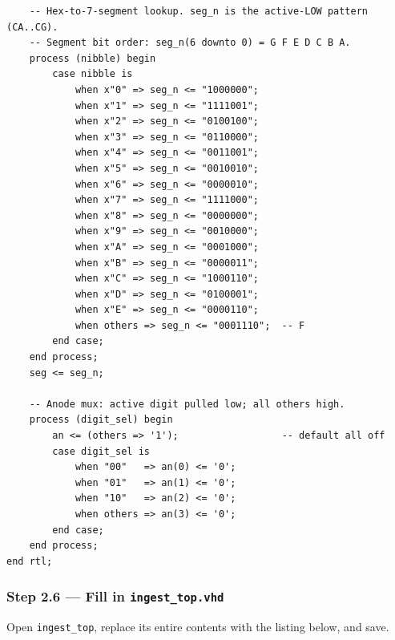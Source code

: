 \documentclass[11pt,letterpaper]{article}
\begin{document}
\begin{lstlisting}
    -- Hex-to-7-segment lookup. seg_n is the active-LOW pattern (CA..CG).
    -- Segment bit order: seg_n(6 downto 0) = G F E D C B A.
    process (nibble) begin
        case nibble is
            when x"0" => seg_n <= "1000000";
            when x"1" => seg_n <= "1111001";
            when x"2" => seg_n <= "0100100";
            when x"3" => seg_n <= "0110000";
            when x"4" => seg_n <= "0011001";
            when x"5" => seg_n <= "0010010";
            when x"6" => seg_n <= "0000010";
            when x"7" => seg_n <= "1111000";
            when x"8" => seg_n <= "0000000";
            when x"9" => seg_n <= "0010000";
            when x"A" => seg_n <= "0001000";
            when x"B" => seg_n <= "0000011";
            when x"C" => seg_n <= "1000110";
            when x"D" => seg_n <= "0100001";
            when x"E" => seg_n <= "0000110";
            when others => seg_n <= "0001110";  -- F
        end case;
    end process;
    seg <= seg_n;

    -- Anode mux: active digit pulled low; all others high.
    process (digit_sel) begin
        an <= (others => '1');                  -- default all off
        case digit_sel is
            when "00"   => an(0) <= '0';
            when "01"   => an(1) <= '0';
            when "10"   => an(2) <= '0';
            when others => an(3) <= '0';
        end case;
    end process;
end rtl;
\end{lstlisting}

\newpage
\subsubsection*{Step 2.6 --- Fill in \texttt{ingest\_top.vhd}}

Open \texttt{ingest\_top}, replace its entire contents with the listing below, and save.
\end{document}
